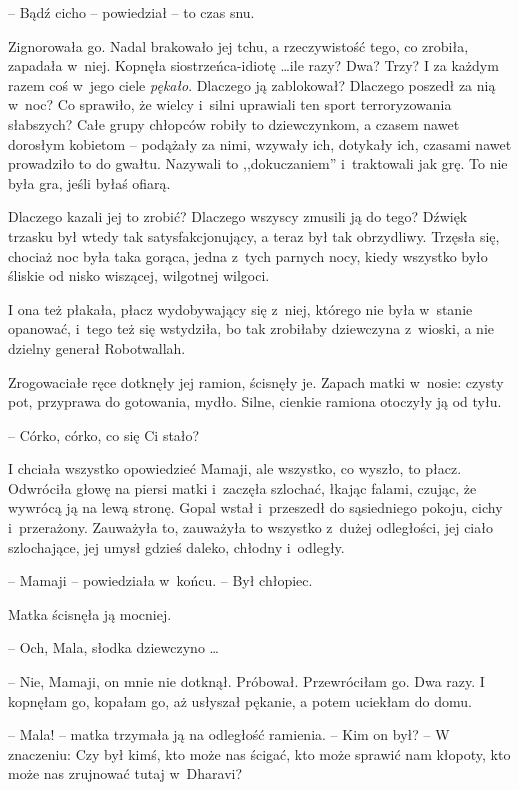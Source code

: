\documentclass[oneside,polish,11pt,rmheadings]{mwbk}
\begin{document}
-- Bądź cicho -- powiedział -- to czas snu. 


Zignorowała go. Nadal brakowało jej tchu, a rzeczywistość tego, co zrobiła, zapadała w~niej. Kopnęła siostrzeńca-idiotę \ldots  ile razy? Dwa? Trzy? I za każdym razem coś w~jego ciele \textit{pękało}. Dlaczego ją zablokował? Dlaczego poszedł za nią w~noc? Co sprawiło, że wielcy i~silni uprawiali ten sport terroryzowania słabszych? Całe grupy chłopców robiły to dziewczynkom, a czasem nawet dorosłym kobietom -- podążały za nimi, wzywały ich, dotykały ich, czasami nawet prowadziło to do gwałtu. Nazywali to ,,dokuczaniem'' i~traktowali jak grę. To nie była gra, jeśli byłaś ofiarą. 


Dlaczego kazali jej to zrobić? Dlaczego wszyscy zmusili ją do tego? Dźwięk trzasku był wtedy tak satysfakcjonujący, a teraz był tak obrzydliwy. Trzęsła się, chociaż noc była taka gorąca, jedna z~tych parnych nocy, kiedy wszystko było śliskie od nisko wiszącej, wilgotnej wilgoci. 


I ona też płakała, płacz wydobywający się z~niej, którego nie była w~stanie opanować, i~tego też się wstydziła, bo tak zrobiłaby dziewczyna z~wioski, a nie dzielny generał Robotwallah. 


Zrogowaciałe ręce dotknęły jej ramion, ścisnęły je. Zapach matki w~nosie: czysty pot, przyprawa do gotowania, mydło. Silne, cienkie ramiona otoczyły ją od tyłu. 


-- Córko, córko, co się Ci stało? 


I chciała wszystko opowiedzieć Mamaji, ale wszystko, co wyszło, to płacz. Odwróciła głowę na piersi matki i~zaczęła szlochać, łkając falami, czując, że wywrócą ją na lewą stronę. Gopal wstał i~przeszedł do sąsiedniego pokoju, cichy i~przerażony. Zauważyła to, zauważyła to wszystko z~dużej odległości, jej ciało szlochające, jej umysł gdzieś daleko, chłodny i~odległy. 


-- Mamaji -- powiedziała w~końcu. -- Był chłopiec. 


Matka ścisnęła ją mocniej. 

-- Och, Mala, słodka dziewczyno \ldots  


-- Nie, Mamaji, on mnie nie dotknął. Próbował. Przewróciłam go. Dwa razy. I kopnęłam go, kopałam go, aż usłyszał pękanie, a potem uciekłam do domu. 


-- Mala! -- matka trzymała ją na odległość ramienia. -- Kim on był? -- W znaczeniu: Czy był kimś, kto może nas ścigać, kto może sprawić nam kłopoty, kto może nas zrujnować tutaj w~Dharavi?
\end{document}
